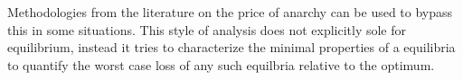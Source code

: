 Methodologies from the literature on  the price of anarchy can be used to bypass this in some situations.
This style of analysis does not explicitly sole for equilibrium, instead it tries to characterize the minimal properties of a equilibria to quantify the worst case loss of any such equilbria relative to the optimum.


